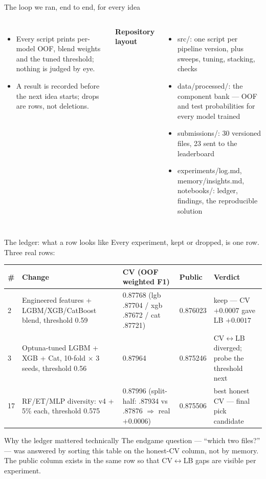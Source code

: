 \documentclass[aspectratio=169,10pt]{beamer}
\newcommand{\file}[1]{{\ttfamily\footnotesize\color{navy}#1}}
\begin{document}
\begin{frame}{The loop we ran, end to end, for every idea}
\begin{columns}[t]
\begin{itemize}
      \item Every script prints per-model OOF, blend weights and the tuned threshold; nothing is judged by eye.
      \item A result is recorded before the next idea starts; drops are rows, not deletions.
    \end{itemize}
    \tiny
    \textbf{Repository layout}
    \begin{itemize}\tiny
      \item \file{src/}: one script per pipeline version, plus sweeps, tuning, stacking, checks
      \item \file{data/processed/}: the component bank --- OOF and test probabilities for every model trained
      \item \file{submissions/}: 30 versioned files, 23 sent to the leaderboard
      \item \file{experiments/log.md}, \file{memory/insights.md}, \file{notebooks/}: ledger, findings, the reproducible solution
    \end{itemize}
  \end{columns}
\end{frame}

\begin{frame}{The ledger: what a row looks like}
  \scriptsize
  Every experiment, kept or dropped, is one row. Three real rows:
  \vspace{4pt}
  \begin{tabular}{@{}p{0.45cm}p{3.9cm}p{3.4cm}p{1.4cm}p{3.1cm}@{}}
    \toprule
    \# & Change & CV (OOF weighted F1) & Public & Verdict\\
    \midrule
    2 & Engineered features + LGBM/XGB/CatBoost blend, threshold 0.59 & 0.87768 (lgb .87704 / xgb .87672 / cat .87721) & 0.876023 & keep --- CV $+0.0007$ gave LB $+0.0017$\\
    3 & Optuna-tuned LGBM + XGB + Cat, 10-fold $\times$ 3 seeds, threshold 0.56 & 0.87964 & 0.875246 & CV$\leftrightarrow$LB diverged; probe the threshold next\\
    17 & RF/ET/MLP diversity: v4 + 5\% each, threshold 0.575 & 0.87996 (split-half: .87934 vs .87876 $\Rightarrow$ real $+0.0006$) & 0.875506 & best honest CV --- final pick candidate\\
    \bottomrule
  \end{tabular}
  \vspace{8pt}
  \begin{block}{Why the ledger mattered technically}
    The endgame question --- ``which two files?'' --- was answered by sorting this table on the honest-CV column,
    not by memory. The public column exists in the same row so that CV$\leftrightarrow$LB gaps are visible per experiment.
  \end{block}
\end{frame}
\end{document}
